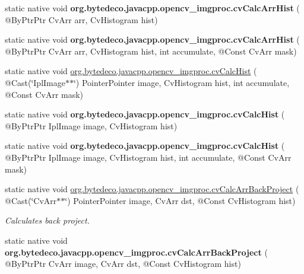 \begin{DoxyCompactItemize}
static native void {\bfseries org.\+bytedeco.\+javacpp.\+opencv\+\_\+imgproc.\+cv\+Calc\+Arr\+Hist} ( @By\+Ptr\+Ptr Cv\+Arr arr, Cv\+Histogram hist)
\item 
\mbox{\label{group__imgproc__c_ga770a0d6c6c08a3576810d314983ad389}} 
static native void {\bfseries org.\+bytedeco.\+javacpp.\+opencv\+\_\+imgproc.\+cv\+Calc\+Arr\+Hist} ( @By\+Ptr\+Ptr Cv\+Arr arr, Cv\+Histogram hist, int accumulate, @Const Cv\+Arr mask)
\item 
static native void \hyperlink{group__imgproc__c_gacbc8dc98c5e08ad4a51431b276bd0044}{org.\+bytedeco.\+javacpp.\+opencv\+\_\+imgproc.\+cv\+Calc\+Hist} ( @Cast(\char`\"{}Ipl\+Image$\ast$$\ast$\char`\"{}) Pointer\+Pointer image, Cv\+Histogram hist, int accumulate, @Const Cv\+Arr mask)
\item 
\mbox{\label{group__imgproc__c_ga64047b61f02fcfacad7495107f905591}} 
static native void {\bfseries org.\+bytedeco.\+javacpp.\+opencv\+\_\+imgproc.\+cv\+Calc\+Hist} ( @By\+Ptr\+Ptr Ipl\+Image image, Cv\+Histogram hist)
\item 
\mbox{\label{group__imgproc__c_gaa25ad24d7c8dc276f62736e932795ecd}} 
static native void {\bfseries org.\+bytedeco.\+javacpp.\+opencv\+\_\+imgproc.\+cv\+Calc\+Hist} ( @By\+Ptr\+Ptr Ipl\+Image image, Cv\+Histogram hist, int accumulate, @Const Cv\+Arr mask)
\item 
static native void \hyperlink{group__imgproc__c_ga579d781d25a70bccc1432e6c6d1fc95c}{org.\+bytedeco.\+javacpp.\+opencv\+\_\+imgproc.\+cv\+Calc\+Arr\+Back\+Project} ( @Cast(\char`\"{}Cv\+Arr$\ast$$\ast$\char`\"{}) Pointer\+Pointer image, Cv\+Arr dst, @Const Cv\+Histogram hist)
\begin{DoxyCompactList}\small\item\em Calculates back project. \end{DoxyCompactList}\item 
\mbox{\label{group__imgproc__c_ga8e78f40f55077abe6682f9659c0ff7a6}} 
static native void {\bfseries org.\+bytedeco.\+javacpp.\+opencv\+\_\+imgproc.\+cv\+Calc\+Arr\+Back\+Project} ( @By\+Ptr\+Ptr Cv\+Arr image, Cv\+Arr dst, @Const Cv\+Histogram hist)
\item 
\mbox{\label{group__imgproc__c_ga49499b0940baaaee15678cbd9f6670c8}} 

\end{DoxyCompactItemize}
